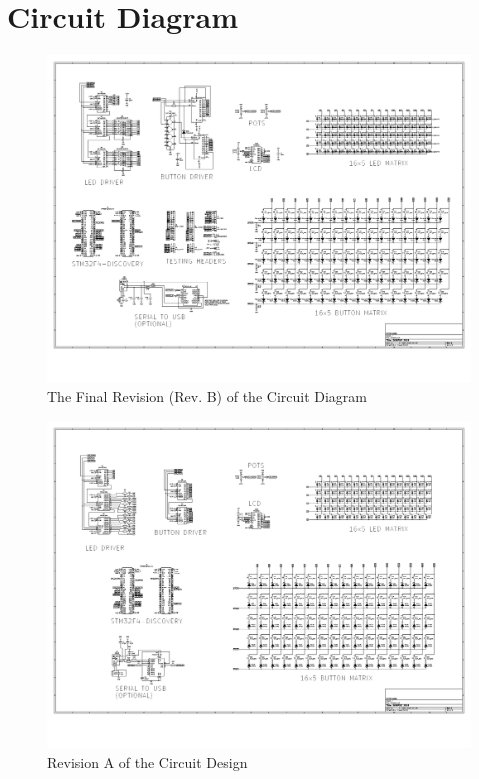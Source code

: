 \documentclass[12pt,a4paper]{report}
\begin{document}
\chapter{Circuit Diagram}
\begin{figure}[h!]
\begin{center}
	\includegraphics[width = \textwidth, angle=0, origin=c]{../Skripsie/Layout_05032019.pdf}
	\caption{The Final Revision (Rev. B) of the Circuit Diagram}
\end{center}
\end{figure}
\begin{figure}[h!]
	\begin{center}
		\includegraphics[width = \textwidth, angle=0, origin=c]{../Skripsie/Layout_28022019.pdf}
		\caption{Revision A of the Circuit Design}
	\end{center}
\end{figure}
\end{document}
